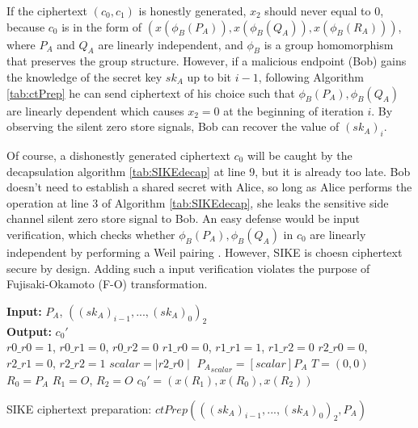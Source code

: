 \documentclass{iacrtrans}
\begin{document}
If the ciphertext $(c_0,c_1)$ is honestly generated, $x_2$ should never equal to $0$, because $c_0$ is in the form of $(x(\phi_B(P_A)), x(\phi_B(Q_A)), x(\phi_B(R_A)))$, where $P_A$ and $Q_A$ are linearly independent, and $\phi_B$ is a group homomorphism that preserves the group structure. However, if a malicious endpoint (Bob) gains the knowledge of the secret key $sk_A$ up to bit $i-1$, following Algorithm \ref{tab:ctPrep} he can send ciphertext of his choice such that $\phi_B(P_A), \phi_B(Q_A)$ are linearly dependent which causes $x_2=0$ at the beginning of iteration $i$. By observing the silent zero store signals, Bob can recover the value of $(sk_A)_{i}$. 

Of course, a dishonestly generated ciphertext $c_0$ will be caught by the decapsulation algorithm \ref{tab:SIKEdecap} at line 9, but it is already too late. Bob doesn't need to establish a shared secret with Alice, so long as Alice performs the operation at line 3 of Algorithm \ref{tab:SIKEdecap}, she leaks the sensitive side channel silent zero store signal to Bob. An easy defense would be input verification, which checks whether $\phi_B(P_A), \phi_B(Q_A)$ in $c_0$ are linearly independent by performing a Weil pairing \cite{azarderakhsh2017supersingular}. However, SIKE is choesn ciphertext secure by design. Adding such a input verification violates the purpose of Fujisaki-Okamoto (F-O) transformation.

\begin{algorithm}[H]
\SetAlgoLined
\textbf{Input: } $P_A$, $((sk_A)_{i-1}, ..., (sk_A)_{0})_2$ \\
\textbf{Output: } $c_0'$ \\
$r0\_r0=1$, $r0\_r1=0$, $r0\_r2=0$ \;
$r1\_r0=0$, $r1\_r1=1$, $r1\_r2=0$ \;
$r2\_r0=0$, $r2\_r1=0$, $r2\_r2=1$ \;
 {
}
$scalar=\mid r2\_r0 \mid$\;
${P_A}_{scalar} = [scalar]P_A$\;
$T=(0,0)$\;
$R_0 = P_A$\;
$R_1 = O$, $R_2=O$\;
$c_0'=(x(R_1), x(R_0), x(R_2))$\;
\caption{SIKE ciphertext preparation: $ctPrep(((sk_A)_{i-1}, ..., (sk_A)_{0})_2, P_A)$}
\label{tab:ctPrep}
\end{algorithm}
\end{document}
